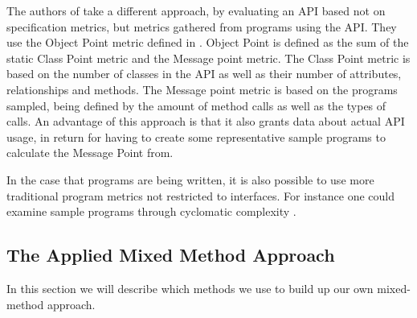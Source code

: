 The authors of \cite{alatalo2013comparative} take a different approach, by evaluating an \gls{API} based not on specification metrics, but metrics gathered from programs using the \gls{API}.
They use the Object Point metric defined in \cite{sneed1995estimating}.
Object Point is defined as the sum of the static Class Point metric and the Message point metric.
The Class Point metric is based on the number of classes in the \gls{API} as well as their number of attributes, relationships and methods.
The Message point metric is based on the programs sampled, being defined by the amount of method calls as well as the types of calls.
An advantage of this approach is that it also grants data about actual \gls{API} usage, in return for having to create some representative sample programs to calculate the Message Point from.

In the case that programs are being written, it is also possible to use more traditional program metrics not restricted to interfaces.
For instance one could examine sample programs through cyclomatic complexity \cite{mccabe1976complexity}.

\subsection{The Applied Mixed Method Approach}
In this section we will describe which methods we use to build up our own mixed-method approach.
